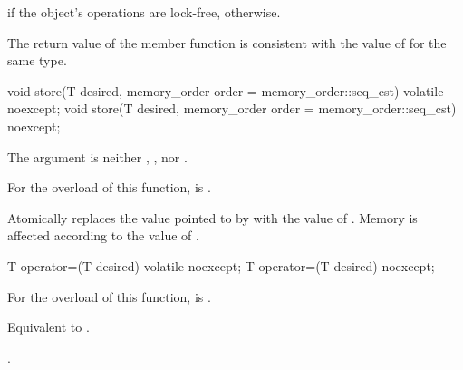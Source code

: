 \begin{itemdescr}
\pnum
\returns
{} if the object's operations are lock-free,  otherwise.
\begin{note}
The return value of the  member function
is consistent with the value of  for the same type.
\end{note}
\end{itemdescr}

%
%
%
%
%
%
\begin{itemdecl}
void store(T desired, memory_order order = memory_order::seq_cst) volatile noexcept;
void store(T desired, memory_order order = memory_order::seq_cst) noexcept;
\end{itemdecl}

\begin{itemdescr}
\pnum
\expects
The  argument is neither ,
, nor .

\pnum
\constraints
For the  overload of this function,
 is .

\pnum
\effects
Atomically replaces the value pointed to by 
with the value of . Memory is affected according to the value of
.
\end{itemdescr}

%
%
%
%
\begin{itemdecl}
T operator=(T desired) volatile noexcept;
T operator=(T desired) noexcept;
\end{itemdecl}

\begin{itemdescr}
\pnum
\constraints
For the  overload of this function,
 is .

\pnum
\effects
Equivalent to .

\pnum
\returns
{}.
\end{itemdescr}

